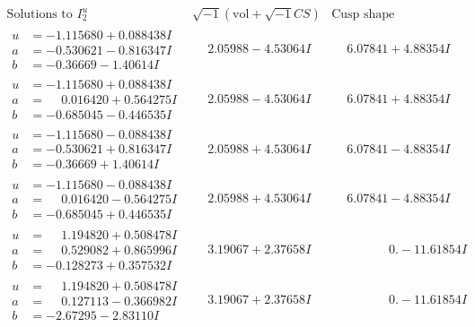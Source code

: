 \documentclass[1p]{elsarticle_modified}
\theoremstyle{definition}
\newcommand{\I}{\sqrt{-1}}
\begin{document}
$$\begin{array}{c|c|c}  
\text{Solutions to }I^u_{2}& \I (\text{vol} + \sqrt{-1}CS) & \text{Cusp shape}\\
 \hline 
\begin{aligned}
u &= -1.115680 + 0.088438 I \\
a &= -0.530621 - 0.816347 I \\
b &= -0.36669 - 1.40614 I\end{aligned}
 & \phantom{-}2.05988 - 4.53064 I & \phantom{-}6.07841 + 4.88354 I \\ \hline\begin{aligned}
u &= -1.115680 + 0.088438 I \\
a &= \phantom{-}0.016420 + 0.564275 I \\
b &= -0.685045 - 0.446535 I\end{aligned}
 & \phantom{-}2.05988 - 4.53064 I & \phantom{-}6.07841 + 4.88354 I \\ \hline\begin{aligned}
u &= -1.115680 - 0.088438 I \\
a &= -0.530621 + 0.816347 I \\
b &= -0.36669 + 1.40614 I\end{aligned}
 & \phantom{-}2.05988 + 4.53064 I & \phantom{-}6.07841 - 4.88354 I \\ \hline\begin{aligned}
u &= -1.115680 - 0.088438 I \\
a &= \phantom{-}0.016420 - 0.564275 I \\
b &= -0.685045 + 0.446535 I\end{aligned}
 & \phantom{-}2.05988 + 4.53064 I & \phantom{-}6.07841 - 4.88354 I \\ \hline\begin{aligned}
u &= \phantom{-}1.194820 + 0.508478 I \\
a &= \phantom{-}0.529082 + 0.865996 I \\
b &= -0.128273 + 0.357532 I\end{aligned}
 & \phantom{-}3.19067 + 2.37658 I & \phantom{-0.000000 } 0. - 11.61854 I \\ \hline\begin{aligned}
u &= \phantom{-}1.194820 + 0.508478 I \\
a &= \phantom{-}0.127113 - 0.366982 I \\
b &= -2.67295 - 2.83110 I\end{aligned}
 & \phantom{-}3.19067 + 2.37658 I & \phantom{-0.000000 } 0. - 11.61854 I \\ \hline\begin{aligned}

\end{aligned}
\end{array}$$
\end{document}
